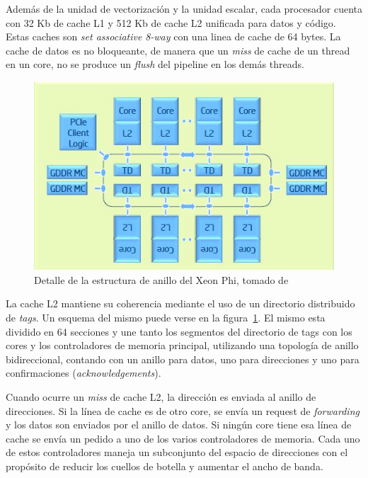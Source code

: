 Adem\'as de la unidad de vectorizaci\'on y la unidad escalar, cada procesador cuenta con 32 Kb de cache L1 y 512 Kb de cache
L2 unificada para datos y c\'odigo. Estas caches son \textit{set associative} \textit{8-way} con una linea de cache de 64 bytes.
La cache de datos es no bloqueante, de manera que un \textit{miss} de cache de un thread en un core,
no se produce un \textit{flush} del pipeline en los dem\'as threads.

\begin{figure}[htbp]
   \centering
   \includegraphics[width=\plotwidth]{images/xeon-phi-ring.jpg}
   \caption{Detalle de la estructura de anillo del Xeon Phi, tomado de~\cite{XeonPhiArchArticle}}
   \label{fig::xeon_phi_arch_ring}
\end{figure}

La cache L2 mantiene su coherencia mediante el uso de un directorio distribuido de \textit{tags}. Un esquema del mismo puede
verse en la figura~\ref{fig::xeon_phi_arch_ring}. El mismo esta dividido en 64 secciones y une tanto los segmentos del
directorio de tags con los cores y los controladores de memoria principal, utilizando una topolog\'ia de anillo bidireccional,
contando con un anillo para datos, uno para direcciones y uno para confirmaciones (\textit{acknowledgements}).

Cuando ocurre un \textit{miss} de cache L2, la direcci\'on es enviada al anillo de direcciones. Si la l\'inea de cache
es de otro core, se env\'ia un request de \textit{forwarding} y los datos son enviados por el anillo de datos. Si ning\'un
core tiene esa l\'inea de cache se env\'ia un pedido a uno de los varios controladores de memoria. Cada uno de estos controladores
maneja un subconjunto del espacio de direcciones con el prop\'osito de reducir los cuellos de botella y aumentar el ancho de banda.

